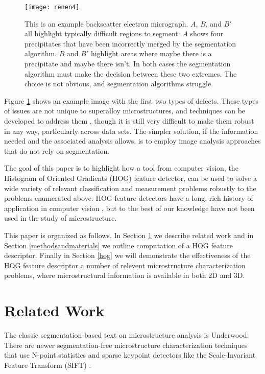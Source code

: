 \documentclass[review]{elsarticle}
\begin{document}
		\begin{figure}[!ht]
	  		\centering
			\texttt{[image: renen4]}
	  		\caption{ This is an example backscatter electron micrograph. $A$, $B$, and $B'$ all highlight typically difficult regions to segment. $A$ shows four precipitates that have been incorrectly merged by the segmentation algorithm. $B$ and $B'$ highlight areas where maybe there is a precipitate and maybe there isn't. In both cases the segmentation algorithm must make the decision between these two extremes. The choice is not obvious, and segmentation algorithms struggle. }
	  		\label{figure1}
		\end{figure}

		Figure \ref{figure1} shows an example image with the first two types of defects. These types of issues are not unique to superalloy microstructures, and techniques can be developed to address them \cite{comer, marc1, marc2, marc3}, though it is still very difficult to make them robust in any way, particularly across data sets. The simpler solution, if the information needed and the associated analysis allows, is to employ image analysis approaches that do not rely on segmentation.
	

		The goal of this paper is to highlight how a tool from computer vision, the Histogram of Oriented Gradients (HOG) feature detector, can be used to solve a wide variety of relevant classification and measurement problems robustly to the problems enumerated above. HOG feature detectors have a long, rich history of application in computer vision \cite{gradtex, hog, girsh}, but to the best of our knowledge have not been used in the study of microstructure.

		This paper is organized as follows. In Section \ref{relatedwork} we describe related work and in Section \ref{methodsandmaterials} we outline computation of a HOG feature descriptor. Finally in Section \ref{hog} we will demonstrate the effectiveness of the HOG feature descriptor a number of relevent microstructure characterization problems, where microstructural information is available in both 2D and 3D.
	
	\section{Related Work}\label{relatedwork}
		The classic segmentation-based text on microstructure analysis is Underwood\cite{underwood}. There are newer segmentation-free microstructure characterization techniques that use N-point statistics \cite{kalidindi1, kalidindi2} and sparse keypoint detectors like the Scale-Invariant Feature Transform (SIFT) \cite{decost}.
\end{document}
